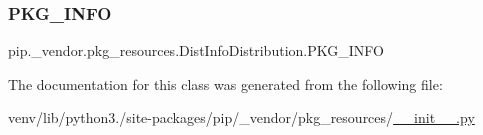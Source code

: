 \subsubsection{\texorpdfstring{P\+K\+G\+\_\+\+I\+N\+FO}{PKG\_INFO}}
{\footnotesize\ttfamily pip.\+\_\+vendor.\+pkg\+\_\+resources.\+Dist\+Info\+Distribution.\+P\+K\+G\+\_\+\+I\+N\+FO\hspace{0.3cm}{\ttfamily [static]}}



The documentation for this class was generated from the following file\+:\begin{DoxyCompactItemize}
\item 
venv/lib/python3./site-\/packages/pip/\+\_\+vendor/pkg\+\_\+resources/\hyperlink{venv_2lib_2python3_89_2site-packages_2pip_2__vendor_2pkg__resources_2____init_____8py}{\+\_\+\+\_\+init\+\_\+\+\_\+.\+py}\end{DoxyCompactItemize}
